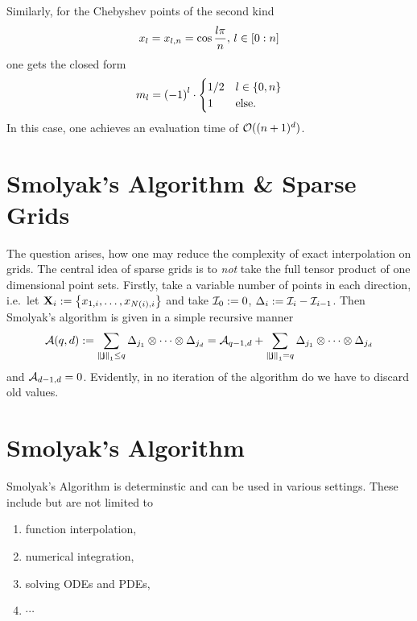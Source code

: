 \documentclass[12pt, oneside]{amsart}
\theoremstyle{definition}
\theoremstyle{remark}
\numberwithin{equation}{section}
\begin{document}
Similarly, for the Chebyshev points of the second kind
\begin{equation}\label{eq:chebyPts2}
    x_l = x_{l, n} = \cos \frac{l \pi}{n},\, l \in \indexset[0]{n}
\end{equation}
one gets the closed form
\begin{equation}\label{eq:weightsChebyshev}
    m_l = {\left(-1\right)}^l \cdot \begin{cases}
        1/2 &l \in \set{0, n}\\
        1 &\text{else.}
    \end{cases}
\end{equation}
In this case, one achieves an evaluation time of \(\cO((n+1)^d)\).


\section{Smolyak's Algorithm \& Sparse Grids}

The question arises, how one may reduce the complexity of exact interpolation on grids. The central idea of sparse grids is to \emph{not} take the full tensor product of one dimensional point sets. Firstly, take a variable number of points in each direction, i.e.\ let \(\XX_i \defn \set{x_{1, i}, \dots, x_{N(i), i}}\) and take \(\cI_0 \defn 0\), \(\Delta_i \defn \cI_i - \cI_{i-1}\). Then Smolyak's algorithm is given in a simple recursive manner
\begin{equation}\label{Smolyak}
    \cA(q, d) \defn \sum_{\norm[1]{\bfj} \leq q} \Delta_{j_1} \otimes \cdots \otimes \Delta_{j_d} = \cA_{q-1, d}+\sum_{\norm[1]{\bfj}=q} \Delta_{j_1} \otimes \cdots \otimes \Delta_{j_d}
\end{equation}
and \(\cA_{d-1, d} = 0\). Evidently, in no iteration of the algorithm do we have to discard old values.

\newpage
\section{Smolyak's Algorithm}

Smolyak's Algorithm is determinstic and can be used in various settings. These include but are not limited to
\begin{enumerate}
    \item function interpolation,
    \item numerical integration,
    \item solving ODEs and PDEs,
    \item \(\cdots\)
\end{enumerate}
\end{document}
